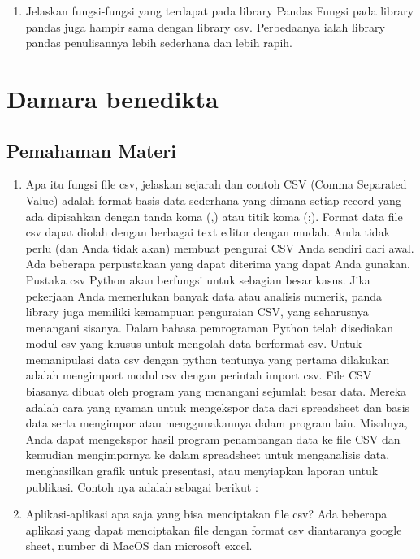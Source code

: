 \begin{enumerate}
\item Jelaskan fungsi-fungsi yang terdapat pada library Pandas
Fungsi pada library pandas juga hampir sama dengan library csv. Perbedaanya ialah library pandas penulisannya lebih sederhana dan lebih rapih.

\end{enumerate}


\section{Damara benedikta}
\subsection{Pemahaman Materi}
\begin{enumerate}
\item Apa itu fungsi file csv, jelaskan sejarah dan contoh
 CSV (Comma Separated Value) adalah format basis data sederhana yang dimana setiap record yang ada dipisahkan dengan tanda koma (,) atau titik koma (;). Format data file csv dapat diolah dengan berbagai text editor dengan mudah. Anda tidak perlu (dan Anda tidak akan) membuat pengurai CSV Anda sendiri dari awal. Ada beberapa perpustakaan yang dapat diterima yang dapat Anda gunakan. Pustaka csv Python akan berfungsi untuk sebagian besar kasus. Jika pekerjaan Anda memerlukan banyak data atau analisis numerik, panda library juga memiliki kemampuan penguraian CSV, yang seharusnya menangani sisanya. Dalam bahasa pemrograman Python telah disediakan modul csv yang khusus untuk mengolah data berformat csv.  Untuk memanipulasi data csv dengan python tentunya yang pertama dilakukan adalah mengimport modul csv dengan perintah import csv. File CSV biasanya dibuat oleh program yang menangani sejumlah besar data. Mereka adalah cara yang nyaman untuk mengekspor data dari spreadsheet dan basis data serta mengimpor atau menggunakannya dalam program lain. Misalnya, Anda dapat mengekspor hasil program penambangan data ke file CSV dan kemudian mengimpornya ke dalam spreadsheet untuk menganalisis data, menghasilkan grafik untuk presentasi, atau menyiapkan laporan untuk publikasi. Contoh nya adalah sebagai berikut :

% 

\item Aplikasi-aplikasi apa saja yang bisa menciptakan file csv?
 Ada beberapa aplikasi yang dapat menciptakan file dengan format csv diantaranya google sheet, number di MacOS dan microsoft excel.

\end{enumerate}
